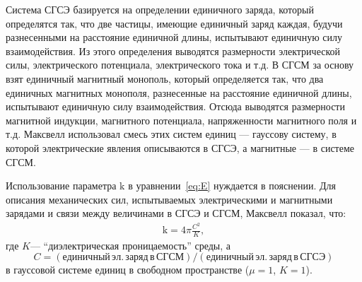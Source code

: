 \documentclass[12pt, oneside, a4paper]{article}
\begin{document}
Система СГСЭ базируется на определении единичного заряда, который определятся так, что две частицы, имеющие единичный заряд каждая, будучи разнесенными на расстояние единичной длины, испытывают единичную силу взаимодействия. Из этого определения выводятся размерности электрической силы, электрического потенциала, электрического тока и т.д. В СГСМ за основу взят единичный магнитный монополь, который определяется так, что два единичных магнитных монополя, разнесенные на расстояние единичной длины, испытывают единичную силу взаимодействия. Отсюда выводятся размерности магнитной индукции, магнитного потенциала, напряженности магнитного поля и т.д. Максвелл использовал смесь этих систем единиц --- гауссову систему, в которой электрические явления описываются в СГСЭ, а магнитные --- в системе СГСМ.

Использование параметра $\mathrm{k}$ в уравнении~\eqref{eq:E} нуждается в пояснении. Для описания механических сил, испытываемых электрическими и магнитными зарядами  и связи между величинами в СГСЭ и СГСМ, Максвелл показал, что:\begin{align}
\mathrm{k}=4\pi\frac{C^2}{K},\label{eq:5.1}
\end{align}
где $K$--- ``диэлектрическая проницаемость'' среды, а
\[
C=(единичный\,эл.\,заряд\,в\,СГСМ)/(единичный\,эл.\,заряд\,в\,СГСЭ)
\]
в гауссовой системе единиц в свободном пространстве ($\mu=1$, $K=1$).
\end{document}
